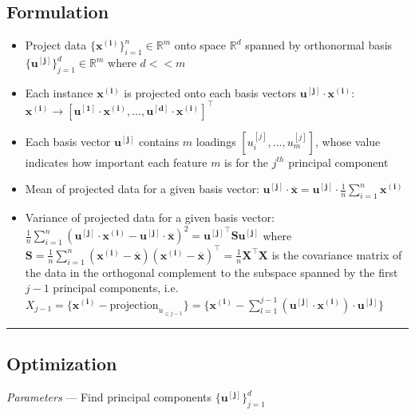 \subsection*{Formulation}
\begin{itemize}
    \item Project data $\{\boldsymbol{x^{(i)}}\}_{i=1}^n \in \mathbb{R}^m$ onto space $\mathbb{R}^d$ spanned by orthonormal basis $\{\boldsymbol{u^{[j]}}\}_{j=1}^d \in \mathbb{R}^m$ where $d << m$
    \item Each instance $\boldsymbol{x^{(i)}}$ is projected onto each basis vectors $\boldsymbol{u^{[j]}} \cdot \boldsymbol{x^{(i)}}$:  $\boldsymbol{x^{(i)}} \to [\boldsymbol{u^{[1]}} \cdot \boldsymbol{x^{(i)}} , ..., \boldsymbol{u^{[d]}} \cdot \boldsymbol{x^{(i)}}]^\intercal$
    \item Each basis vector $\boldsymbol{u^{[j]}}$ contains $m$ loadings $[u_i^{[j]}, ..., u_m^{[j]}]$, whose value indicates how important each feature $m$ is for the $j^{th}$ principal component
    \item Mean of projected data for a given basis vector: $\boldsymbol{u^{[j]}} \cdot \overline{\boldsymbol{x}} = \boldsymbol{u^{[j]}} \cdot \frac{1}{n} \sum_{i=1}^n \boldsymbol{x^{(i)}}$
    \item Variance of projected data for a given basis vector: $\frac{1}{n} \sum_{i=1}^n (\boldsymbol{u^{[j]}} \cdot \boldsymbol{x^{(i)}} - \boldsymbol{u^{[j]}} \cdot \overline{\boldsymbol{x}})^2 = \boldsymbol{u^{[j]}}^\intercal \boldsymbol{S} \boldsymbol{u^{[j]}}$ where $\boldsymbol{S} = \frac{1}{n} \sum_{i=1}^n (\boldsymbol{x^{(i)}} - \overline{\boldsymbol{x}})(\boldsymbol{x^{(i)}} - \overline{\boldsymbol{x}})^\intercal = \frac{1}{n} \boldsymbol{X}^\intercal \boldsymbol{X}$ is the covariance matrix of the data in the orthogonal complement to the subspace spanned by the first $j-1$ principal components, i.e. $X_{j-1} = \{ \boldsymbol{x^{(i)}} - \textrm{projection}_{u_{\leq j-1}} \} = \{ \boldsymbol{x^{(i)}} - \sum_{l=1}^{j-1} (\boldsymbol{u^{[j]}} \cdot \boldsymbol{x^{(i)}} ) \cdot  \boldsymbol{u^{[j]}} \}$
\end{itemize}

{\color{black}\hrule height 0.001mm}

\subsection*{Optimization}
\emph{Parameters} --- Find principal components $\{\boldsymbol{u^{[j]}}\}_{j=1}^d$

